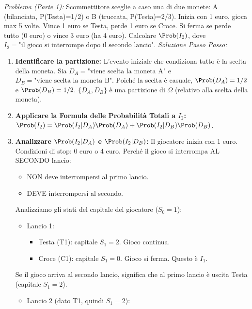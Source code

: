 \begin{example}
\textit{Problema (Parte 1):} Scommettitore sceglie a caso una di due monete: A (bilanciata, P(Testa)=1/2) o B (truccata, P(Testa)=2/3). Inizia con 1 euro, gioca max 5 volte. Vince 1 euro se Testa, perde 1 euro se Croce. Si ferma se perde tutto (0 euro) o vince 3 euro (ha 4 euro).
Calcolare $\Prob(I_2)$, dove $I_2 = \text{"il gioco si interrompe dopo il secondo lancio"}$.
\textit{Soluzione Passo Passo:}
\begin{enumerate}
    \item \textbf{Identificare la partizione:} L'evento iniziale che condiziona tutto è la scelta della moneta.
    Sia $D_A = \text{"viene scelta la moneta A"}$ e $D_B = \text{"viene scelta la moneta B"}$.
    Poiché la scelta è casuale, $\Prob(D_A) = 1/2$ e $\Prob(D_B) = 1/2$.
    $\{D_A, D_B\}$ è una partizione di $\Omega$ (relativo alla scelta della moneta).
    \item \textbf{Applicare la Formula delle Probabilità Totali a $I_2$:}
    $\Prob(I_2) = \Prob(I_2|D_A)\Prob(D_A) + \Prob(I_2|D_B)\Prob(D_B)$.
    \item \textbf{Analizzare $\Prob(I_2|D_A)$ e $\Prob(I_2|D_B)$:}
    Il giocatore inizia con 1 euro.
    Condizioni di stop: 0 euro o 4 euro.
    Perché il gioco si interrompa AL SECONDO lancio:
    \begin{itemize}
        \item NON deve interrompersi al primo lancio.
        \item DEVE interrompersi al secondo.
    \end{itemize}
    Analizziamo gli stati del capitale del giocatore ($S_0=1$):
    \begin{itemize}
        \item Lancio 1:
            \begin{itemize}
                \item Testa (T1): capitale $S_1=2$. Gioco continua.
                \item Croce (C1): capitale $S_1=0$. Gioco si ferma. Questo è $I_1$.
            \end{itemize}
    \end{itemize}
    Se il gioco arriva al secondo lancio, significa che al primo lancio è uscita Testa (capitale $S_1=2$).
    \begin{itemize}
        \item Lancio 2 (dato T1, quindi $S_1=2$):
            \begin{itemize}

\end{itemize}
\end{itemize}
\end{enumerate}
\end{example}
